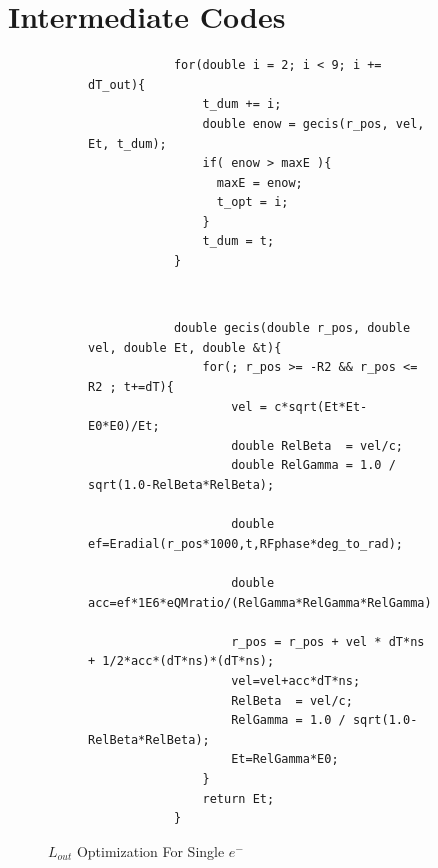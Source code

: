 \documentclass[a4paper,oneside,12pt]{report}
\numberwithin{equation}{chapter}
\begin{document}
\chapter{Intermediate Codes} \label{appendix:intermediate_codes}
\begin{figure}[H]
    \centering
    \begin{subfigure}{\textwidth}
        \centering
        \begin{verbatim}
            for(double i = 2; i < 9; i += dT_out){
                t_dum += i;
                double enow = gecis(r_pos, vel, Et, t_dum);
                if( enow > maxE ){
                  maxE = enow;
                  t_opt = i;
                }
                t_dum = t;
            }
        \end{verbatim}
    \end{subfigure} 
    \\
    \begin{subfigure}{\textwidth}
        \centering
        \begin{verbatim}
            double gecis(double r_pos, double vel, double Et, double &t){
                for(; r_pos >= -R2 && r_pos <= R2 ; t+=dT){
                    vel = c*sqrt(Et*Et-E0*E0)/Et;
                    double RelBeta  = vel/c;
                    double RelGamma = 1.0 / sqrt(1.0-RelBeta*RelBeta);
                
                    double ef=Eradial(r_pos*1000,t,RFphase*deg_to_rad);
                
                    double acc=ef*1E6*eQMratio/(RelGamma*RelGamma*RelGamma); 
                
                    r_pos = r_pos + vel * dT*ns + 1/2*acc*(dT*ns)*(dT*ns);
                    vel=vel+acc*dT*ns;
                    RelBeta  = vel/c;
                    RelGamma = 1.0 / sqrt(1.0-RelBeta*RelBeta);
                    Et=RelGamma*E0; 
                }
                return Et;
            }
        \end{verbatim}
    \end{subfigure}
    \caption{$L_{out}$ Optimization For Single $e^-$}
    \label{fig:lout_opt_single_e}
\end{figure}
\end{document}

